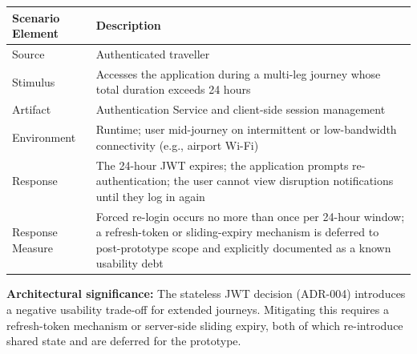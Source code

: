 \documentclass[12pt,a4paper]{article}
\begin{document}
\begin{tabularx}{\textwidth}{L{3.5cm}X}
\toprule
\textbf{Scenario Element} & \textbf{Description} \\
\midrule
Source            & Authenticated traveller \\
Stimulus          & Accesses the application during a multi-leg journey whose total duration
                    exceeds 24 hours \\
Artifact          & Authentication Service and client-side session management \\
Environment       & Runtime; user mid-journey on intermittent or low-bandwidth connectivity
                    (e.g., airport Wi-Fi) \\
Response          & The 24-hour JWT expires; the application prompts re-authentication; the
                    user cannot view disruption notifications until they log in again \\
Response Measure  & Forced re-login occurs no more than once per 24-hour window; a
                    refresh-token or sliding-expiry mechanism is deferred to post-prototype
                    scope and explicitly documented as a known usability debt \\
\bottomrule
\end{tabularx}

\textbf{Architectural significance:} The stateless JWT decision (ADR-004) introduces a negative
usability trade-off for extended journeys. Mitigating this requires a refresh-token mechanism or
server-side sliding expiry, both of which re-introduce shared state and are deferred for the
prototype.
\end{document}

